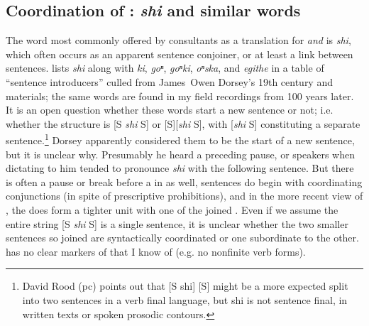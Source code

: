 \documentclass[output=paper]{LSP/langsci}
\begin{document}
\subsection{Coordination of : \textit{shi}  and similar words}  

    The word most commonly offered by  consultants as a translation for \textit{and} is \textit{shi}, which often occurs as an apparent sentence conjoiner, or at least a  link between sentences. \citet[52]{Koontz1984} lists \textit{shi} along with \textit{ki}, \textit{goⁿ}, \textit{goⁿki}, \textit{oⁿska}, and \textit{egithe} in a table of ``sentence introducers'' culled from James~Owen Dorsey's 19th century  and  materials; the same words are found in my field recordings from 100 years later.  It is an open question whether these words start a new sentence or not; i.e. whether the structure is [S \textit{shi} S] or [S][\textit{shi} S], with [\textit{shi} S] constituting a separate sentence.\footnote{David Rood (pc) points out that [S shi] [S] might be a more expected split into two sentences in a verb final language, but shi is not sentence final, in written texts or spoken prosodic contours.}  Dorsey apparently considered them to be the start of a new sentence, but it is unclear why. Presumably he heard a preceding pause, or speakers when dictating to him tended to pronounce \textit{shi} with the following sentence. But there is often a pause or break before a  in  as well, sentences do begin with coordinating conjunctions (in spite of prescriptive prohibitions), and in the more recent view of , the  does form a tighter unit with one of the joined . Even if we assume the entire string [S \textit{shi} S] is a single sentence, it is unclear whether the two smaller sentences so joined are syntactically coordinated or one subordinate to the other.  has no clear markers of  that I know of (e.g. no nonfinite verb forms).  
\end{document}
